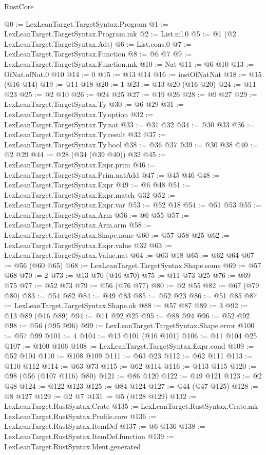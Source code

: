 \begin{lexlean}{RustCore}
\begin{coremodule}
@0 := LexLeanTarget.TargetSyntax.Program
@1 := LexLeanTarget.TargetSyntax.Program.mk
@2 := List.nil.{0}
@5 := @1 (@2 LexLeanTarget.TargetSyntax.Adt)
@6 := List.cons.{0}
@7 := LexLeanTarget.TargetSyntax.Function
@8 := @6 @7
@9 := LexLeanTarget.TargetSyntax.Function.mk
@10 := Nat
@11 := @6 @10
@13 := OfNat.ofNat.{0} @10
@14 := 0
@15 := @13 @14
@16 := instOfNatNat
@18 := @15 (@16 @14)
@19 := @11 @18
@20 := 1
@23 := @13 @20 (@16 @20)
@24 := @11 @23
@25 := @2 @10
@26 := @24 @25
@27 := @19 @26
@28 := @9 @27
@29 := LexLeanTarget.TargetSyntax.Ty
@30 := @6 @29
@31 := LexLeanTarget.TargetSyntax.Ty.option
@32 := LexLeanTarget.TargetSyntax.Ty.nat
@33 := @31 @32
@34 := @30 @33
@36 := LexLeanTarget.TargetSyntax.Ty.result @32
@37 := LexLeanTarget.TargetSyntax.Ty.bool
@38 := @36 @37
@39 := @30 @38
@40 := @2 @29
@44 := @28 (@34 (@39 @40)) @32
@45 := LexLeanTarget.TargetSyntax.Expr.prim
@46 := LexLeanTarget.TargetSyntax.Prim.natAdd
@47 := @45 @46
@48 := LexLeanTarget.TargetSyntax.Expr
@49 := @6 @48
@51 := LexLeanTarget.TargetSyntax.Expr.match @32
@52 := LexLeanTarget.TargetSyntax.Expr.var
@53 := @52 @18
@54 := @51 @53
@55 := LexLeanTarget.TargetSyntax.Arm
@56 := @6 @55
@57 := LexLeanTarget.TargetSyntax.Arm.arm
@58 := LexLeanTarget.TargetSyntax.Shape.none
@60 := @57 @58 @25
@62 := LexLeanTarget.TargetSyntax.Expr.value @32
@63 := LexLeanTarget.TargetSyntax.Value.nat
@64 := @63 @18
@65 := @62 @64
@67 := @56 (@60 @65)
@68 := LexLeanTarget.TargetSyntax.Shape.some
@69 := @57 @68
@70 := 2
@73 := @13 @70 (@16 @70)
@75 := @11 @73 @25
@76 := @69 @75
@77 := @52 @73
@79 := @56 (@76 @77)
@80 := @2 @55
@82 := @67 (@79 @80)
@83 := @54 @82
@84 := @49 @83
@85 := @52 @23
@86 := @51 @85
@87 := LexLeanTarget.TargetSyntax.Shape.ok
@88 := @57 @87
@89 := 3
@92 := @13 @89 (@16 @89)
@94 := @11 @92 @25
@95 := @88 @94
@96 := @52 @92
@98 := @56 (@95 @96)
@99 := LexLeanTarget.TargetSyntax.Shape.error
@100 := @57 @99
@101 := 4
@104 := @13 @101 (@16 @101)
@106 := @11 @104 @25
@107 := @100 @106
@108 := LexLeanTarget.TargetSyntax.Expr.cond
@109 := @52 @104
@110 := @108 @109
@111 := @63 @23
@112 := @62 @111
@113 := @110 @112
@114 := @63 @73
@115 := @62 @114
@116 := @113 @115
@120 := @98 (@56 (@107 @116) @80)
@121 := @86 @120
@122 := @49 @121
@123 := @2 @48
@124 := @122 @123
@125 := @84 @124
@127 := @44 (@47 @125)
@128 := @8 @127
@129 := @2 @7
@131 := @5 (@128 @129)
@132 := LexLeanTarget.RustSyntax.Crate
@135 := LexLeanTarget.RustSyntax.Crate.mk LexLeanTarget.RustSyntax.Profile.core
@136 := LexLeanTarget.RustSyntax.ItemDef
@137 := @6 @136
@138 := LexLeanTarget.RustSyntax.ItemDef.function
@139 := LexLeanTarget.RustSyntax.Ident.generated

\end{coremodule}
\end{lexlean}
